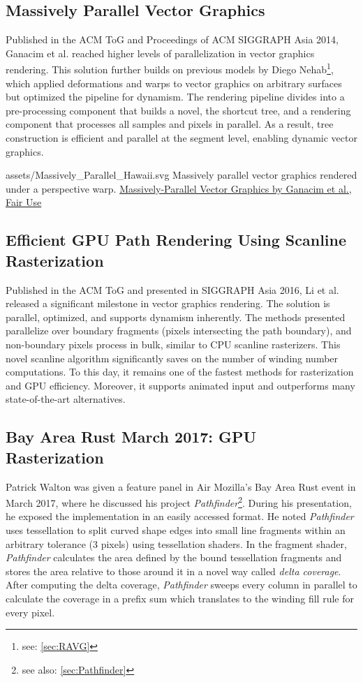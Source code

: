 \subsection{Massively Parallel Vector Graphics}\cite{Ganacim14}
Published in the ACM ToG and Proceedings of ACM SIGGRAPH Asia 2014, Ganacim et al. reached higher levels of parallelization in vector graphics rendering. This solution further builds on previous models by Diego Nehab\footnote{see: \cref{sec:RAVG}}, which applied deformations and warps to vector graphics on arbitrary surfaces but optimized the pipeline for dynamism. The rendering pipeline divides into a pre-processing component that builds a novel, the shortcut tree, and a rendering component that processes all samples and pixels in parallel. As a result, tree construction is efficient and parallel at the segment level, enabling dynamic vector graphics.

\widesvg
{assets/Massively_Parallel_Hawaii.svg}
{Massively parallel vector graphics rendered under a perspective warp.}
{\href{https://w3.impa.br/~diego/projects/GanEtAl14/index.html}{Massively-Parallel Vector Graphics by Ganacim et al., Fair Use}}\medskip

\subsection{Efficient GPU Path Rendering Using Scanline Rasterization}\label{sec:scanline_vg}\cite{Li16}
Published in the ACM ToG and presented in SIGGRAPH Asia 2016, Li et al. released a significant milestone in vector graphics rendering. The solution is parallel, optimized, and supports dynamism inherently. The methods presented parallelize over boundary fragments (pixels intersecting the path boundary), and non-boundary pixels process in bulk, similar to CPU scanline rasterizers. This novel scanline algorithm significantly saves on the number of winding number computations. To this day, it remains one of the fastest methods for rasterization and GPU efficiency. Moreover, it supports animated input and outperforms many state-of-the-art alternatives.

\subsection{Bay Area Rust March 2017: GPU Rasterization}\cite{Walton18}
Patrick Walton was given a feature panel in Air Mozilla's Bay Area Rust event in March 2017, where he discussed his project \textit{Pathfinder}\footnote{see also: \cref{sec:Pathfinder}}. During his presentation, he exposed the implementation in an easily accessed format. He noted \textit{Pathfinder} uses tessellation to split curved shape edges into small line fragments within an arbitrary tolerance (3 pixels) using tessellation shaders. In the fragment shader, \textit{Pathfinder} calculates the area defined by the bound tessellation fragments and stores the area relative to those around it in a novel way called \textit{delta coverage}. After computing the delta coverage, \textit{Pathfinder} sweeps every column in parallel to calculate the coverage in a prefix sum which translates to the winding fill rule for every pixel.

